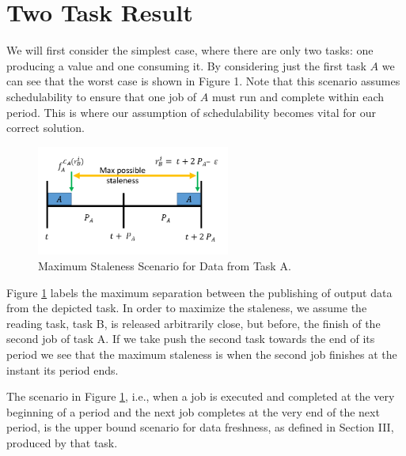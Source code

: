 \section{Two Task Result}

We will first consider the simplest case, where there are only two tasks: one producing a value and one consuming it. By considering just the first task $A$ we can see that the worst case is shown in Figure 1. Note that this scenario assumes schedulability to ensure that one job of $A$ must run and complete within each period. This is where our assumption of schedulability becomes vital for our correct solution.

\begin{figure}[!ht]
	\centering
	\includegraphics[width=2.5in]{figures/2TaskMaxStaleness}
	\caption{Maximum Staleness Scenario for Data from Task A.}
	\label{fig:2Tasks}
\end{figure}

Figure \ref{fig:2Tasks} labels the maximum separation between the publishing of output data from the depicted task. In order to maximize the staleness, we assume the reading task, task B, is released arbitrarily close, but before, the finish of the second job of task A. If we take push the second task towards the end of its period we see that the maximum staleness is when the second job finishes at the instant its period ends.

\begin{theorem}
	\label{thm:2TaskMaxWaiting}
	The scenario in Figure \ref{fig:2Tasks}, i.e., when a job is executed and completed at the very beginning of a period and the next job completes at the very end of the next period, is the upper bound scenario for data freshness, as defined in Section III, produced by that task.
\end{theorem}

